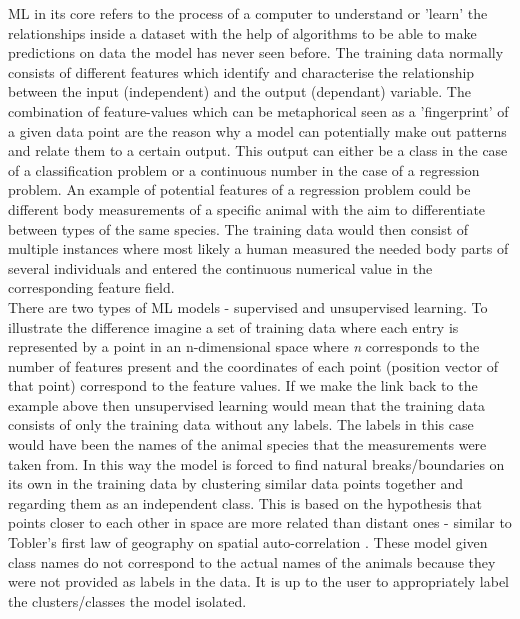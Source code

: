 ML in its core refers to the process of a computer to understand or 'learn' the relationships inside a dataset with the help of algorithms to be able to make predictions on data the model has never seen before.
The training data normally consists of different features which identify and characterise the relationship between the input (independent) and the output (dependant) variable. The combination of feature-values which can be metaphorical seen as a 'fingerprint' of a given data point are the reason why a model can potentially make out patterns and relate them to a certain output. This output can either be a class in the case of a classification problem or a continuous number in the case of a regression problem.
An example of potential features of a regression problem could be different body measurements of a specific animal with the aim to differentiate between types of the same species. The training data would then consist of multiple instances where most likely a human measured the needed body parts of several individuals and entered the continuous numerical value in the corresponding feature field.\\
\newline
There are two types of ML models - supervised and unsupervised learning. To illustrate the difference imagine a set of training data where each entry is represented by a point in an n-dimensional space where \textit{n} corresponds to the number of features present and the coordinates of each point (position vector of that point) correspond to the feature values. If we make the link back to the example above then unsupervised learning would mean that the training data consists of only the training data without any labels. The labels in this case would have been the names of the animal species that the measurements were taken from. In this way the model is forced to find natural breaks/boundaries on its own in the training data by clustering similar data points together and regarding them as an independent class. This is based on the hypothesis that points closer to each other in space are more related than distant ones - similar to Tobler's first law of geography on spatial auto-correlation \parencite{Tobler1970}. These model given class names do not correspond to the actual names of the animals because they were not provided as labels in the data. It is up to the user to appropriately label the clusters/classes the model isolated.

